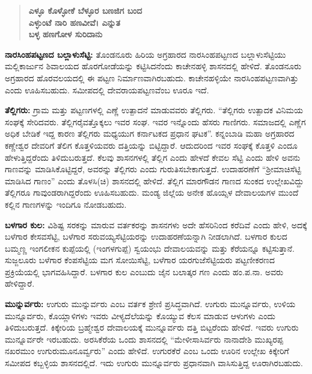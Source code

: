 \begin{verse}
\textbf{ಎಳ್ಳೂ ಕೊಳ್ಳೋಕೆ ಬೆಳ್ಳೂರ ಬಣಜಿಗ ಬಂದ} \\\textbf{ಎಳ್ಳುಂಟೆ ನಾರಿ ಹಣವೀವೆ। ಎನ್ನುತ} \\\textbf{ಬಳ್ಳ ಹಣಗೋಳ ಸುರಿದಾನು}
\end{verse}

\textbf{ನಾರಸಿಂಹಪಟ್ಟಣದ ಬಲ್ಲಾಳುಸೆಟ್ಟಿ: } ತೊಂಡನೂರು ಹಿರಿಯ ಅಗ್ರಹಾರದ ನಾರಸಿಂಹಪಟ್ಟಣದ ಬಲ್ಲಾಳುಸೆಟ್ಟಿಯು ಮಲ್ಲಿಕಾರ್ಜುನ ಶಿವಾಲಯದ ಹೊರಗೋಡೆಯನ್ನು ಕಟ್ಟಿಸಿದನೆಂದು ಕಾಚೇನಹಳ್ಳಿ ಶಾಸನದಲ್ಲಿ ಹೇಳಿದೆ. ತೊಂಡನೂರು ಅಗ್ರಹಾರದ ಹೊರವಲಯದಲ್ಲಿ ಈ ಪಟ್ಟಣ ನಿರ್ಮಾಣವಾಗಿರಬಹುದು. ಕಾಚೇನಹಳ್ಳಿಯೇ ನಾರಸಿಂಹಪಟ್ಟಣವಾಗಿತ್ತು ಎಂದು ಊಹಿಸಬಹುದು. ಸಮೀಪದಲ್ಲಿ ದೇವರಾಯಪಟ್ಟಣವೆಂಬ ಊರೂ ಇದೆ.

\textbf{ತೆಲ್ಲಿಗರು:} ಗ್ರಾಮ ಮತ್ತು ಪಟ್ಟಣಗಳಲ್ಲಿ ಎಣ್ಣೆ ಉತ್ಪಾದನೆ ಮಾಡುವವರು ತೆಲ್ಲಿಗರು. “ತೆಲ್ಲಿಗರು ಉತ್ಪಾದಕ ವಿನಿಮಯ ಸಂಘಕ್ಕೆ ಸೇರಿದವರು. ತೆಲ್ಲಿಗರೈವತ್ತೊಕ್ಕಲು ಇವರ ಸಂಘ. ಇವರ ಇನ್ನೊಂದು ಹೆಸರು ಗಾಣಿಗರು. ಸಮಾಜದಲ್ಲಿ ಎಣ್ಣೆಗ ಅಧಿಕ ಬೇಡಿಕೆ ಇದ್ದ ಕಾರಣ ತೆಲ್ಲಿಗರು ಮಧ್ಯಯುಗ ಕರ್ನಾಟಕದ ಪ್ರಧಾನ ಘಟಕ”. ಕನ್ನಂಬಾಡಿ ಮಹಾ ಅಗ್ರಹಾರದ ಕಣ್ಣೇಶ್ವರ ದೇವರಿಗೆ ತೆಲಿಗ ಕೊತ್ತಳಿಯವರು ದತ್ತಿಯನ್ನು ಬಿಟ್ಟಿದ್ದಾರೆ. ಆದುದರಿಂದ ಇವರ ಸಂಘಕ್ಕೆ ಕೊತ್ತಳಿ ಎಂದೂ ಹೇಳುತ್ತಿದ್ದರೆಂದು ತಿಳಿದುಬರುತ್ತದೆ. ಕೆಲವು ಶಾಸನಗಳಲ್ಲಿ ತೆಲ್ಲಿಗ ಎಂದು ಹೇಳದೆ ಕೇವಲ ಸೆಟ್ಟಿ ಎಂದು ಹೇಳಿ ಅವನು ಗಾಣವನ್ನು ಮಾಡಿಸಿಕೊಟ್ಟಿದ್ದರೆ, ಅವರನ್ನು ತೆಲ್ಲಿಗರು ಎಂದು ಗುರುತಿಸಬೇಕಾಗುತ್ತದೆ. ಉದಾಹರಣೆಗೆ “ಶ‍್ರೀಮಾಚಿಸೆಟ್ಟಿ ಮಾಡಿಸಿದ ಗಾಣಂ” ಎಂದು ತೊಳಸಿ(ಚಿ) ಶಾಸನದಲ್ಲಿ ಹೇಳಿದೆ. ತೆಲ್ಲಿಗ ಮಾರಗೌಡನ ಗಾಣದ ಸುಂಕದ ಉಲ್ಲೇಖವಿದ್ದು ತೆಲ್ಲಿಗರೂ ಗಾವುಂಡರಾಗಿದ್ದರೆಂದು ಊಹಿಸಬಹುದು. ಮಂಡ್ಯ ಜಿಲ್ಲೆಯ ಅನೇಕ ಹೊಯ್ಸಳ ದೇವಾಲಯಗಳ ಮುಂದೆ ಕಲ್ಲಿನ ಗಾಣಗಳನ್ನು ಇಂದಿಗೂ ನೋಡಬಹುದು.

\textbf{ಬಳಗಾರ ಕುಲ:} ವಿಶಿಷ್ಟ ಸರಕನ್ನು ಮಾರುವ ವರ್ತಕರನ್ನು ಶಾಸನಗಳು ಅದೇ ಹೆಸರಿನಿಂದ ಕರೆದಿವೆ ಎಂದು ಹೇಳಿ, ಅದಕ್ಕೆ ಬಳೆಗಾರ ಕೇಸವಸೆಟ್ಟಿ, ಬಳೆಗಾರ ಸರುವಯ್ಯಸೆಟ್ಟಿಯರನ್ನು ಉದಾಹರಣೆಯನ್ನಾಗಿ ನೀಡಲಾಗಿದೆ. ಬಳಗಾರ ಕುಲದ ಬಮ್ಮಣ್ಣ ಇಂಗಲೀಕನ ಕುಪ್ಪೆಯಲ್ಲಿ (ಇಂಗಳಗುಪ್ಪೆ) ಸ್ವಯಂಭು ದೇವಾಲಯವನ್ನು ಮತ್ತು ಕೆರೆಯನ್ನೂ ಕಟ್ಟಿಸುತ್ತಾನೆ. ಸುಜ್ಜಲೂರು ಬಳೆಗಾರ ಕೆಂಪಸೆಟ್ಟಿಯ ಮಗ ಸೋಯಿಸೆಟ್ಟಿ, ಬಳೆಗಾರ ಯರಗುಜೆಸೆಟ್ಟಿಯರು ಪಟ್ಟಣೀಕರಣದ ಪ್ರಕ್ರಿಯೆಯಲ್ಲಿ ಭಾಗವಹಿಸಿದ್ದಾರೆ. ಬಳಗಾರ ಕುಲ ಎಂಬುದು ಜೈನ ಬಲಾತ್ಕರ ಗಣ ಎಂದು ಹಂ.ಪ.ನಾ. ಅವರು ಹೇಳಿದ್ದಾರೆ.

\vskip 3pt

\textbf{ಮುನ್ನುರ್ವರು: } ಉಗುರು ಮುನ್ನುರ್ವರು ಎಂಬ ವರ್ತಕ ಶ್ರೇಣಿ ಪ್ರಸಿದ್ಧವಾಗಿದೆ. ಉಗುರು ಮುನ್ನೂರ್ವರು, ಉಳಿಯ ಮುನ್ನೂರ್ವರು, ಕೊಯ್ಲಾಳಿಗಳು ಇವರು ವೀಳ್ಯದೆಲೆಯನ್ನು ಕೊಯ್ಯುವ ಕೆಲಸ ಮಾಡುವ ಆಳುಗಳು ಎಂದು ತಿಳಿದುಬರುತ್ತದೆ. ಕಿಕ್ಕೇರಿಯ ಬ್ರಹ್ಮೇಶ್ವರ ದೇವಾಲಯಕ್ಕೆ ಮುನ್ನೂರ್ವರು ದತ್ತಿ ಬಿಟ್ಟರೆಂದು ಹೇಳಿದೆ. ಇವರು ಉಗುರು ಮುನ್ನೂರ್ವರೇ ಇರಬಹುದು. ಅರಸಿಕೆರೆಯ ಒಂದು ಶಾಸನದಲ್ಲಿ “ಮೇಳೀಸಾಸಿರ್ವರು ನಾನಾದೇಶಿ ಮುಖ್ಯರಪ್ಪ ನಖರಮುಂ ಉಗುರುಮೂನೂರ್ವ್ವರು” ಎಂದು ಹೇಳಿದೆ. ಉಗುರಕೆರೆ ಎಂಬ ಒಂದು ಊರಿನ ಉಲ್ಲೇಖ ಕಿಕ್ಕೇರಿಗೆ ಸಮೀಪದ ಕಬ್ಬಳ್ಳಿಯ ಶಾಸನದಲ್ಲಿದೆ. ಇದು ಉಗುರು ಮುನ್ನೂರ್ವರು ಪ್ರಧಾನವಾಗಿ ವಾಸಿಸುತ್ತಿದ್ದ ಊರಾಗಿರಬಹುದು.

